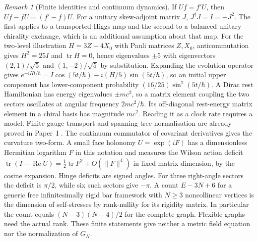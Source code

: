 \documentclass[aps,pra,onecolumn,superscriptaddress,nofootinbib,10pt]{revtex4-2}
\theoremstyle{definition}
\theoremstyle{remark}
\newtheorem{remark}[theorem]{Remark}
\begin{document}
\begin{remark}[Finite identities and continuum dynamics]\label{ub:arclimits}
If $Uf=f'U$, then $Uf-fU=(f'-f)U$. For a unitary skew-adjoint
matrix $J$, $J^\dagger J=I=-J^2$. The first applies to a transported
Higgs map and the second to a balanced unitary chirality exchange,
which is an additional assumption about that map. For the two-level
illustration $H=3Z+4X_0$ with Pauli matrices $Z,X_0$, anticommutation
gives $H^2=25I$ and $\operatorname{tr}H=0$, hence eigenvalues $\pm5$
with eigenvectors $(2,1)/\sqrt5$ and $(1,-2)/\sqrt5$ by substitution.
Expanding the evolution operator gives
$e^{-iHt/\hbar}=I\cos(5t/\hbar)-i(H/5)\sin(5t/\hbar)$, so an initial
upper component has lower-component probability
$(16/25)\sin^2(5t/\hbar)$. A Dirac rest Hamiltonian has energy
eigenvalues $\pm mc^2$, so a matrix element coupling the two sectors
oscillates at angular frequency $2mc^2/\hbar$. Its off-diagonal
rest-energy matrix element in a chiral basis has magnitude $mc^2$.
Reading it as a clock rate requires a model.
Finite gauge transport and spanning-tree normalisation are already
proved in Paper~I \cite[Part~0]{PaperI}. The continuum commutator of covariant derivatives gives the
curvature two-form. A small face holonomy $U=\exp(iF)$ has a
dimensionless Hermitian logarithm $F$ in this notation and measures the Wilson action deficit
$\operatorname{tr}(I-\operatorname{Re}U)
=\frac12\operatorname{tr}F^2+O(\|F\|^4)$ in fixed matrix dimension,
by the cosine expansion. Hinge deficits are signed angles. For three
right-angle sectors the deficit is $\pi/2$, while six such sectors
give $-\pi$. A count $E-3N+6$ for a generic free infinitesimally
rigid bar framework with $N\ge3$ noncollinear vertices is the
dimension of self-stresses by rank-nullity for its rigidity matrix.
In particular the count equals $(N-3)(N-4)/2$ for the complete graph.
Flexible graphs need the actual rank. These finite statements give
neither a metric field equation nor the normalization of $G_N$.
\end{remark}
\end{document}

